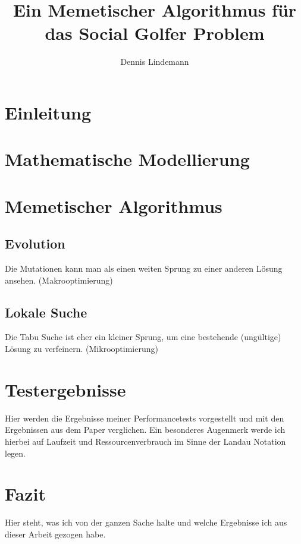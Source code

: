 \documentclass[draft]{tcs-seminar}
\begin{document}
\title{Ein Memetischer Algorithmus für das Social Golfer Problem}
\author{Dennis Lindemann}

\begin{abstract}

\end{abstract}

\maketitle


\section{Einleitung}
  


\section{Mathematische Modellierung}
    
\section{Memetischer Algorithmus}
  \subsection{Evolution}
    Die Mutationen kann man als einen weiten Sprung zu einer anderen Lösung ansehen. (Makrooptimierung)
  \subsection{Lokale Suche}
    Die Tabu Suche ist eher ein kleiner Sprung, um eine bestehende (ungültige) Lösung zu verfeinern. (Mikrooptimierung)

\section{Testergebnisse}
Hier werden die Ergebnisse meiner Performancetests vorgestellt und mit den Ergebnissen aus dem Paper verglichen. Ein besonderes Augenmerk werde ich hierbei auf Laufzeit und Ressourcenverbrauch im Sinne der Landau Notation legen.



\section{Fazit}
Hier steht, was ich von der ganzen Sache halte und welche Ergebnisse ich aus dieser Arbeit gezogen habe.

\begin{thebibliography}{9}  
    
\end{thebibliography}
\end{document}
